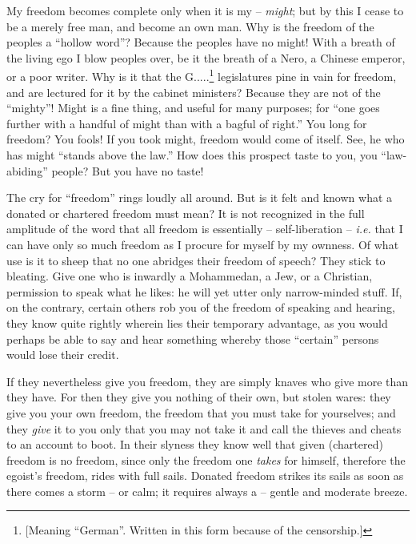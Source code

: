 \documentclass[12pt,a4paper]{book}
\begin{document}
My freedom becomes complete only when it is my -- \textit{might}; but by this 
I cease to be a merely free man, and become an own man. Why is the freedom of 
the peoples a ``hollow word''? Because the peoples have no might! With a 
breath of the living ego I blow peoples over, be it the breath of a Nero, a 
Chinese emperor, or a poor writer. Why is it that the G.....\footnote{[Meaning 
``German''. Written in this form because of the censorship.]} legislatures 
pine in vain for freedom, and are lectured for it by the cabinet ministers? 
Because they are not of the ``mighty''! Might is a fine thing, and useful 
for many purposes; for ``one goes further with a handful of might than with a 
bagful of right.'' You long for freedom? You fools! If you took might, 
freedom would come of itself. See, he who has might ``stands above the 
law.'' How does this prospect taste to you, you ``law-abiding'' people? But 
you have no taste!

The cry for ``freedom'' rings loudly all around. But is it felt and known 
what a donated or chartered freedom must mean? It is not recognized in the 
full amplitude of the word that all freedom is essentially -- self-liberation 
-- \textit{i.e.} that I can have only so much freedom as I procure for myself 
by my ownness. Of what use is it to sheep that no one abridges their freedom 
of speech? They stick to bleating. Give one who is inwardly a Mohammedan, a 
Jew, or a Christian, permission to speak what he likes: he will yet utter only 
narrow-minded stuff. If, on the contrary, certain others rob you of the 
freedom of speaking and hearing, they know quite rightly wherein lies their 
temporary advantage, as you would perhaps be able to say and hear something 
whereby those ``certain'' persons would lose their credit.

If they nevertheless give you freedom, they are simply knaves who give more 
than they have. For then they give you nothing of their own, but stolen wares: 
they give you your own freedom, the freedom that you must take for yourselves; 
and they \textit{give} it to you only that you may not take it and call the 
thieves and cheats to an account to boot. In their slyness they know well that 
given (chartered) freedom is no freedom, since only the freedom one 
\textit{takes} for himself, therefore the egoist's freedom, rides with full 
sails. Donated freedom strikes its sails as soon as there comes a storm -- or 
calm; it requires always a -- gentle and moderate breeze.
\end{document}
